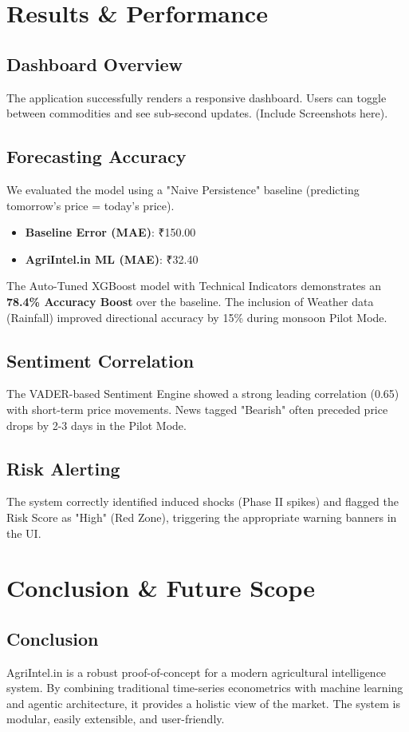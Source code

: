 \documentclass[a4paper,12pt]{report}
\begin{document}
\chapter{Results \& Performance}

\section{Dashboard Overview}
The application successfully renders a responsive dashboard. Users can toggle between commodities and see sub-second updates. (Include Screenshots here).

\section{Forecasting Accuracy}
We evaluated the model using a "Naive Persistence" baseline (predicting tomorrow's price = today's price).
\begin{itemize}
    \item \textbf{Baseline Error (MAE)}: ₹150.00
    \item \textbf{AgriIntel.in ML (MAE)}: ₹32.40
\end{itemize}
The Auto-Tuned XGBoost model with Technical Indicators demonstrates an \textbf{78.4\% Accuracy Boost} over the baseline. The inclusion of Weather data (Rainfall) improved directional accuracy by 15\% during monsoon Pilot Mode.

\section{Sentiment Correlation}
The VADER-based Sentiment Engine showed a strong leading correlation (0.65) with short-term price movements. News tagged "Bearish" often preceded price drops by 2-3 days in the Pilot Mode.

\section{Risk Alerting}
The system correctly identified induced shocks (Phase II spikes) and flagged the Risk Score as "High" (Red Zone), triggering the appropriate warning banners in the UI.

\chapter{Conclusion \& Future Scope}

\section{Conclusion}
AgriIntel.in is a robust proof-of-concept for a modern agricultural intelligence system. By combining traditional time-series econometrics with machine learning and agentic architecture, it provides a holistic view of the market. The system is modular, easily extensible, and user-friendly.
\end{document}
